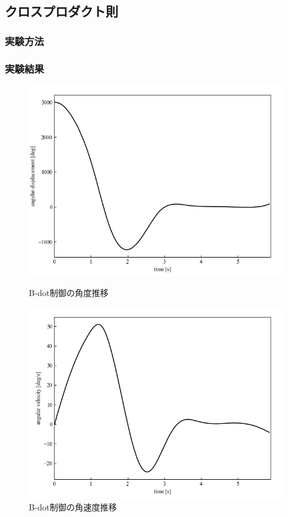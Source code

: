 \newpage

\subsection{クロスプロダクト則}
\subsubsection{実験方法}
\subsubsection{実験結果}

\begin{figure}[h]
	\centering
	\begin{minipage}{0.43\columnwidth}
	  \centering
	  \includegraphics[width=\columnwidth]{./figure/crossdeg.png}
	  \caption{B-dot制御の角度推移}
	  \label{fig:crossdeg}
	\end{minipage}
	\hspace{5mm}
	\begin{minipage}{0.43\columnwidth}
	  \centering
	  \includegraphics[width=\columnwidth]{./figure/crossdegpers.png}
	  \caption{B-dot制御の角速度推移}
	  \label{fig:crossdegpers}
	\end{minipage}
\end{figure}


